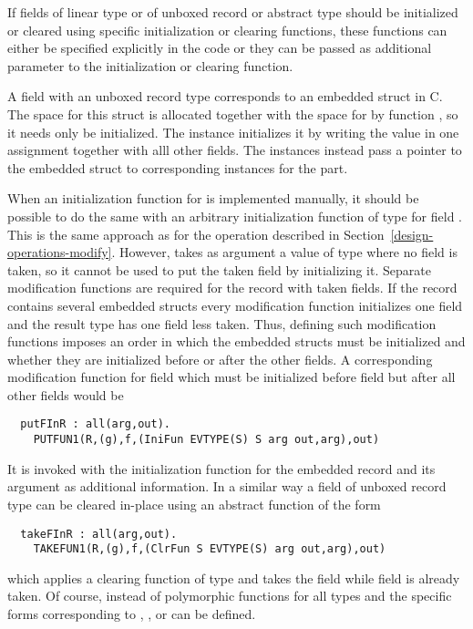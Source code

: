 If fields of linear type or of unboxed record or abstract type should be initialized or cleared using specific initialization
or clearing functions, these functions can either be specified explicitly in the code or they can be passed as additional
parameter to the initialization or clearing function. 

A field  with an unboxed record type  corresponds to an embedded struct in C. The space for this struct is allocated together
with the space for  by function , so it needs only be initialized. The  instance initializes 
it by writing the value in one assignment together with alll other fields. The  instances instead pass a pointer 
to the embedded struct to corresponding  instances for the part. 

When an initialization function for  is implemented
manually, it should be possible to do the same with an arbitrary initialization function of type 
for field . This is the same approach as for the operation  described in Section~\ref{design-operations-modify}.
However,  takes as argument a value of type 
where no field is taken, so it cannot be used to put the taken field  by initializing it. Separate modification functions
are required for the record with taken fields. If the record contains several embedded structs every modification function
initializes one field and the result type has one field less taken. Thus, defining such modification functions imposes an order
in which the embedded structs must be initialized and whether they are initialized before or after the other fields. A corresponding
modification function for field  which must be initialized before field  but after all other fields would be
\begin{verbatim}
  putFInR : all(arg,out). 
    PUTFUN1(R,(g),f,(IniFun EVTYPE(S) S arg out,arg),out)
\end{verbatim}
It is invoked with the initialization function for the embedded record and its argument 
as additional information. In a similar way a field of unboxed record type  can be cleared in-place using an abstract
function of the form
\begin{verbatim}
  takeFInR : all(arg,out).
    TAKEFUN1(R,(g),f,(ClrFun S EVTYPE(S) arg out,arg),out)
\end{verbatim}
which applies a clearing function of type  and takes the field  while field  
is already taken. Of course, instead of polymorphic functions for all types  and  the specific forms
corresponding to , , or  can be defined.


